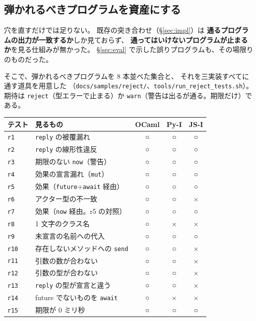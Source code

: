 \documentclass[11pt,a4paper]{ltjsarticle}
\theoremstyle{definition}
\theoremstyle{remark}
\begin{document}
\subsection{弾かれるべきプログラムを資産にする}
\label{sec:reject}

穴を直すだけでは足りない。
既存の突き合わせ（\S\ref{sec:impl}）は
\textbf{通るプログラムの出力が一致するか}しか見ておらず、
\textbf{通ってはいけないプログラムが止まるか}を見る仕組みが無かった。
\S\ref{sec:eval} で示した誤りプログラムも、その場限りのものだった。

そこで、弾かれるべきプログラムを 8 本並べた集合と、
それを三実装すべてに通す道具を用意した
（\texttt{docs/samples/reject/}、\texttt{tools/run\_reject\_tests.sh}）。
期待は \texttt{reject}（型エラーで止まる）か
\texttt{warn}（警告は出るが通る。期限だけ）である。

\begin{center}
\begin{tabular}{llccc}
\toprule
テスト & 見るもの & OCaml & Py-I & JS-I \\
\midrule
\texttt{r1}  & \texttt{reply} の被覆漏れ           & ○ & ○ & ○ \\
\texttt{r2}  & \texttt{reply} の線形性違反         & ○ & ○ & ○ \\
\texttt{r3}  & 期限のない \texttt{now}（警告）     & ○ & ○ & ○ \\
\texttt{r4}  & 効果の宣言漏れ（\texttt{mut}）      & ○ & ○ & ○ \\
\texttt{r5}  & 効果（\texttt{future}+\texttt{await} 経由） & ○ & ○ & ○ \\
\texttt{r6}  & アクター型の不一致                  & ○ & ○ & × \\
\texttt{r7}  & 効果（\texttt{now} 経由。r5 の対照）  & ○ & ○ & ○ \\
\texttt{r8}  & 1 文字のクラス名                    & ○ & × & × \\
\texttt{r9}  & 未宣言の名前への代入                & ○ & ○ & ○ \\
\texttt{r10} & 存在しないメソッドへの \texttt{send} & ○ & ○ & × \\
\texttt{r11} & 引数の数が合わない                  & ○ & ○ & × \\
\texttt{r12} & 引数の型が合わない                  & ○ & ○ & × \\
\texttt{r13} & \texttt{reply} の型が宣言と違う      & ○ & ○ & × \\
\texttt{r14} & future でないものを \texttt{await}   & ○ & × & × \\
\texttt{r15} & 期限が 0 ミリ秒                     & ○ & ○ & ○ \\
\bottomrule
\end{tabular}
\end{center}
\end{document}
